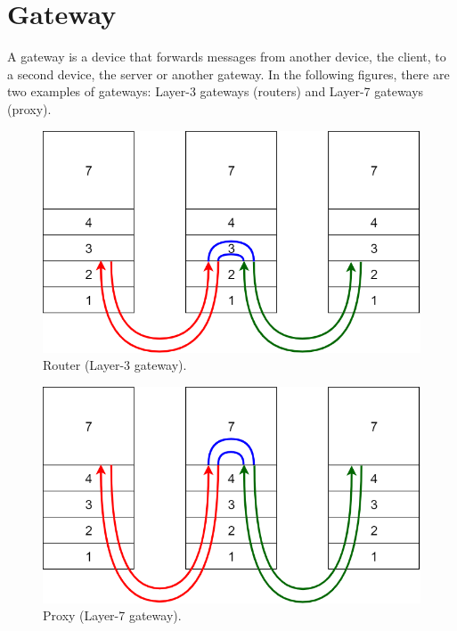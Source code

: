 \chapter{Gateway}
A gateway is a device that forwards messages from another device, the client, to a second device, the server or another gateway.
In the following figures, there are two examples of gateways: Layer-3 gateways (routers) and Layer-7 gateways (proxy).
\begin{figure}[h]
\centering
\includegraphics[scale=0.4]{Images/Gateway/gateway_3}
\caption{\footnotesize{Router (Layer-3 gateway).}}\label{gateway_3}
\end{figure}
\begin{figure}[h]
\centering
\includegraphics[scale=0.4]{Images/Gateway/gateway_7}
\caption{\footnotesize{Proxy (Layer-7 gateway).}}\label{gateway_7}
\end{figure}

